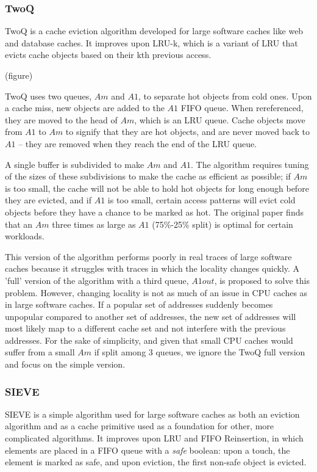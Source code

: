 \subsubsection{TwoQ}
TwoQ is a cache eviction algorithm developed for large software caches like web and database caches.
It improves upon LRU-k, which is a variant of LRU that evicts cache objects based on their kth previous access.

(figure)

TwoQ uses two queues, $Am$ and $A1$, to separate hot objects from cold ones.
Upon a cache miss, new objects are added to the $A1$ FIFO queue.
When rereferenced, they are moved to the head of $Am$, which is an LRU queue.
Cache objects move from $A1$ to $Am$ to signify that they are hot objects, and are never moved back to $A1$ –
they are removed when they reach the end of the LRU queue.

A single buffer is subdivided to make $Am$ and $A1$.
The algorithm requires tuning of the sizes of these subdivisions to make the cache as efficient as possible;
if $Am$ is too small, the cache will not be able to hold hot objects for long enough before they are evicted,
and if $A1$ is too small, certain access patterns will evict cold objects before they have a chance to be marked as hot.
The original paper finds that an $Am$ three times as large as $A1$ (75\%-25\% split) is optimal for certain workloads.

This version of the algorithm performs poorly in real traces of large software caches because
it struggles with traces in which the locality changes quickly.
A 'full' version of the algorithm with a third queue, $A1out$, is proposed to solve this problem.
However, changing locality is not as much of an issue in CPU caches as in large software caches.
If a popular set of addresses suddenly becomes unpopular compared to another set of addresses,
the new set of addresses will most likely map to a different cache set and not interfere with the previous addresses.
For the sake of simplicity, and given that small CPU caches would suffer from a small $Am$ if split among 3 queues,
we ignore the TwoQ full version and focus on the simple version.

\subsubsection{SIEVE}

SIEVE is a simple algorithm used for large software caches as both an eviction algorithm
and as a cache primitive used as a foundation for other, more complicated algorithms.
It improves upon LRU and FIFO Reinsertion,
in which elements are placed in a FIFO queue with a \textit{safe} boolean:
upon a touch, the element is marked as safe, and upon eviction,
the first non-safe object is evicted.

